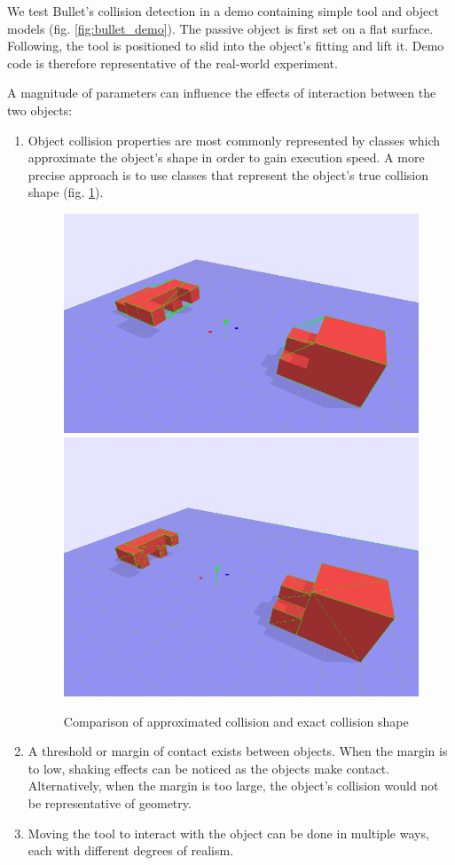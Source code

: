 \documentclass[11]{article}
\begin{document}
We test Bullet's collision detection in a demo containing simple tool and object models (fig. \ref{fig:bullet_demo}).
The passive object is first set on a flat surface.
Following, the tool is positioned to slid into the object's fitting and lift it.
Demo code is therefore representative of the real-world experiment.  

A magnitude of parameters can influence the effects of interaction between the two objects:
\begin{enumerate}
  \item Object collision properties are most commonly represented by classes which approximate the object's shape in order to gain execution speed.
    A more precise approach is to use classes that represent the object's true collision shape (fig. \ref{fig:collision_shape}).   

\begin{figure}[h]
  \centering
  \includegraphics[width=.48\textwidth]{./figures/collision_approximation.png}
  \includegraphics[width=.41\textwidth]{./figures/collision_exact.png}
  \caption{Comparison of approximated collision and exact collision shape}
  \label{fig:collision_shape}
\end{figure}      

  \item A threshold or margin of contact exists between objects. When the margin is to low, shaking effects can be noticed as the objects make contact. Alternatively, when the margin is too large, the object's collision would not be representative of geometry. 

  \item Moving the tool to interact with the object can be done in multiple ways, each with different degrees of realism.
\end{enumerate}
\end{document}
